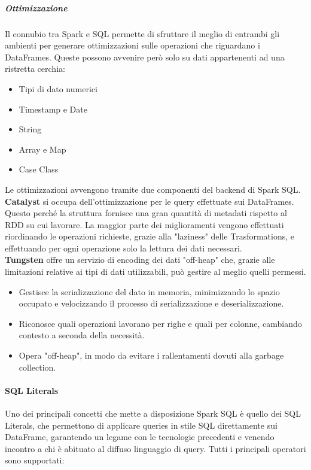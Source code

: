 \subparagraph{Ottimizzazione} 
Il connubio tra Spark e SQL permette di sfruttare il meglio di entrambi gli ambienti per generare ottimizzazioni sulle operazioni che riguardano i DataFrames. Queste possono avvenire però solo su dati appartenenti ad una ristretta cerchia:

\begin{itemize}
	\item Tipi di dato numerici
	\item Timestamp e Date
	\item String
	\item Array e Map
	\item Case Class
\end{itemize}
Le ottimizzazioni avvengono tramite due componenti del backend di Spark SQL.\\
\textbf{Catalyst} si occupa dell'ottimizzazione per le query effettuate sui DataFrames. Questo perché la struttura fornisce una gran quantità di metadati rispetto al RDD su cui lavorare. La maggior parte dei miglioramenti vengono effettuati riordinando le operazioni richieste, grazie alla "laziness" delle Trasformations, e effettuando per ogni operazione solo la lettura dei dati necessari.\\
\textbf{Tungsten} offre un servizio di encoding dei dati "off-heap" che, grazie alle limitazioni relative ai tipi di dati utilizzabili, può gestire al meglio quelli permessi. 

\begin{itemize}
	\item Gestisce la serializzazione del dato in memoria, minimizzando lo spazio occupato e velocizzando il processo di serializzazione e deserializzazione.
	\item Riconosce quali operazioni lavorano per righe e quali per colonne, cambiando contesto a seconda della necessità.
	\item Opera "off-heap", in modo da evitare i rallentamenti dovuti alla garbage collection.
\end{itemize}

\paragraph{SQL Literals} Uno dei principali concetti che mette a disposizione Spark SQL è quello dei SQL Literals, che permettono di applicare queries in stile SQL direttamente sui DataFrame, garantendo un legame con le tecnologie precedenti e venendo incontro a chi è abituato al diffuso linguaggio di query. Tutti i principali operatori sono supportati:

